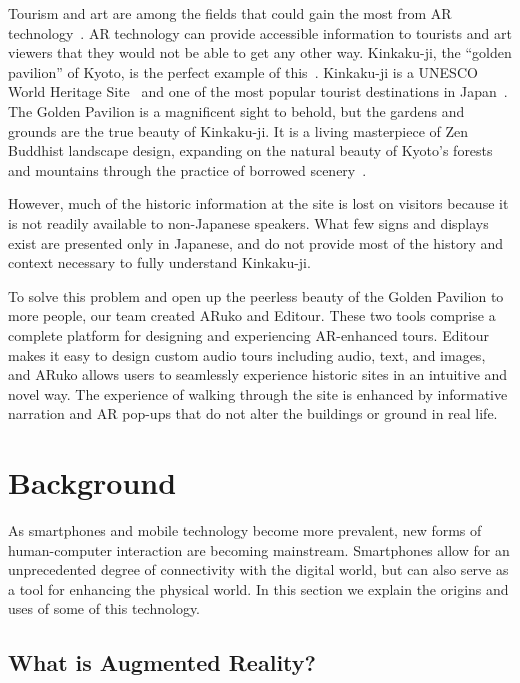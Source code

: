 \documentclass[a4paper, 10pt, american, titlepage]{article}
\begin{document}
Tourism and art are among the fields that could gain the most from AR
technology~\autocite{saenz2009, katz2018}. AR technology can provide accessible
information to tourists and art viewers that they would not be able to get any
other way. Kinkaku-ji, the ``golden pavilion'' of Kyoto, is the perfect example
of this~\autocite{bornoff2000}. Kinkaku-ji is a UNESCO World Heritage
Site~\autocite{unesco} and one of the most popular tourist destinations in
Japan~\autocite{japanguide2019}. The Golden Pavilion is a magnificent sight to
behold, but the gardens and grounds are the true beauty of Kinkaku-ji. It is a
living masterpiece of Zen Buddhist landscape design, expanding on the natural
beauty of Kyoto's forests and mountains through the practice of borrowed
scenery~\autocite{kuitert2002}.

However, much of the historic information at the site is lost on visitors
because it is not readily available to non-Japanese speakers. What few signs and
displays exist are presented only in Japanese, and do not provide most of the
history and context necessary to fully understand Kinkaku-ji.

To solve this problem and open up the peerless beauty of the Golden Pavilion to
more people, our team created ARuko and Editour. These two tools comprise a
complete platform for designing and experiencing AR-enhanced tours. Editour
makes it easy to design custom audio tours including audio, text, and images,
and ARuko allows users to seamlessly experience historic sites in an intuitive
and novel way. The experience of walking through the site is enhanced by
informative narration and AR pop-ups that do not alter the buildings or ground
in real life.

\clearpage

\section{Background}
\label{sec:background}

As smartphones and mobile technology become more prevalent, new forms of
human-computer interaction are becoming mainstream. Smartphones allow for an
unprecedented degree of connectivity with the digital world, but can also serve
as a tool for enhancing the physical world. In this section we explain the
origins and uses of some of this technology.

\subsection{What is Augmented Reality?}
\label{sec:whatIsAugmentedReality}
\end{document}
